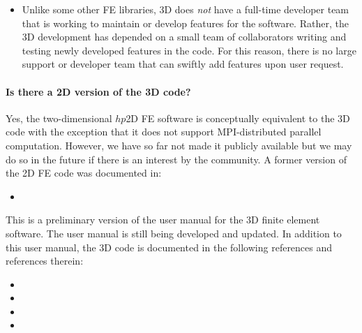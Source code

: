 \begin{itemize}
\item Unlike some other FE libraries, \hp3D does \emph{not} have a full-time developer team that is working to maintain or develop features for the software. Rather, the \hp3D development has depended on a small team of collaborators writing and testing newly developed features in the code. For this reason, there is no large support or developer team that can swiftly add features upon user request.

\end{itemize}

\paragraph{Is there a 2D version of the \hp3D code?} Yes, the two-dimensional $hp$2D FE software is conceptually equivalent to the 3D code with the exception that it does not support MPI-distributed parallel computation. However, we have so far not made it publicly available but we may do so in the future if there is an interest by the community. A former version of the 2D FE code was documented in:
\begin{itemize}
	\item {}
\end{itemize}

\begin{remark}
This is a preliminary version of the user manual for the \hp3D finite element software. The user manual is still being developed and updated. In addition to this user manual, the \hp3D code is documented in the following references and references therein:

\begin{itemize}
	\item {}
	\item {}
	\item {}
	\item {}
\end{itemize}

\end{remark}

%


